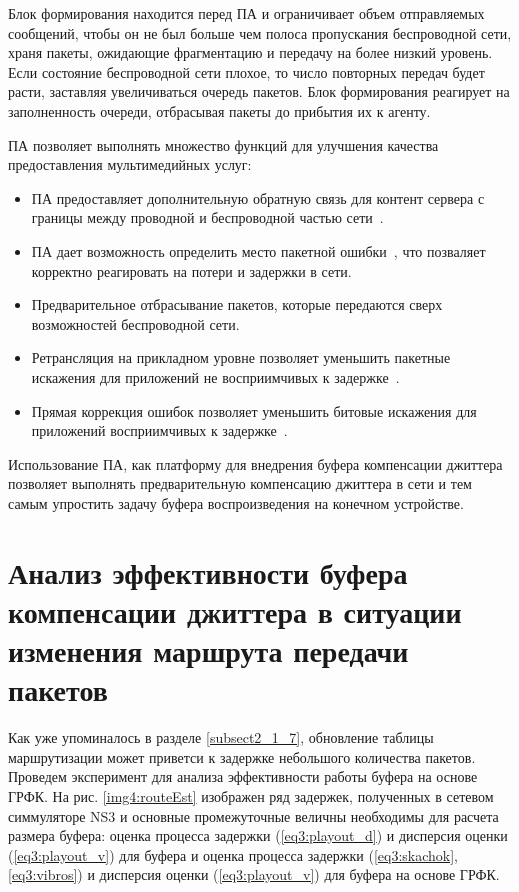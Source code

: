 Блок формирования находится перед ПА и ограничивает объем отправляемых сообщений, чтобы он не был больше чем полоса пропускания беспроводной сети, храня пакеты, ожидающие фрагментацию и передачу на более низкий уровень. Если состояние беспроводной сети плохое, то число повторных передач будет расти, заставляя увеличиваться очередь пакетов. Блок формирования реагирует на заполненность очереди, отбрасывая пакеты до прибытия их к агенту.

ПА позволяет выполнять множество функций для улучшения качества предоставления мультимедийных услуг:
\begin{itemize}
\item ПА предоставляет дополнительную обратную связь для контент сервера с границы между проводной  и беспроводной частью сети \cite{SAdouble_feedback}.
\item ПА дает возможность определить место пакетной ошибки \cite{SAdouble_feedback}, что позваляет корректно реагировать на потери и задержки в сети.
\item Предварительное отбрасывание пакетов, которые передаются сверх возможностей беспроводной сети.
\item Ретрансляция на прикладном уровне позволяет уменьшить  пакетные искажения  для приложений не восприимчивых к задержке \cite{SArateOpt, SArealtime}.
\item Прямая коррекция ошибок позволяет уменьшить битовые искажения для приложений восприимчивых к задержке \cite{SArateOpt, SArealtime}.
\end{itemize}

Использование ПА, как платформу для внедрения буфера компенсации джиттера позволяет выполнять предварительную компенсацию джиттера в сети и тем самым упростить задачу буфера воспроизведения  на конечном устройстве.



\section{Анализ эффективности буфера компенсации джиттера в ситуации изменения маршрута передачи пакетов} \label{sect4}

Как уже упоминалось в разделе \ref{subsect2_1_7}, обновление таблицы маршрутизации может приветси к задержке небольшого количества пакетов. Проведем эксперимент для анализа эффективности работы буфера на основе ГРФК. На рис. \ref{img4:routeEst} изображен ряд задержек, полученных в сетевом симмуляторе NS3 и основные промежуточные величны необходимы для расчета размера буфера: оценка процесса задержки (\ref{eq3:playout_d}) и дисперсия оценки (\ref{eq3:playout_v}) для буфера \cite{Ramjee} и оценка процесса задержки (\ref{eq3:skachok},\ref{eq3:vibros}) и дисперсия оценки (\ref{eq3:playout_v}) для буфера на основе ГРФК.

